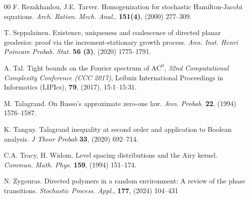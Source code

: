 \documentclass[reqno]{amsart}
\begin{document}
\begin{thebibliography}{00}
 F. Rezakhanlou, J.E. Tarver. Homogenization for stochastic Hamilton-Jacobi equations. {\em Arch. Ration. Mech. Anal.}, {\bf 151(4)}, (2000) 277--309.

 T. Seppalainen. Existence, uniqueness and coalescence of directed planar geodesics:
proof via the increment-stationary growth process. {\em Ann. Inst. Henri Poincare Probab.
Stat.} {\bf 56 (3)}, (2020) 1775--1791.

 A. Tal. Tight bounds on the Fourier spectrum of $\mbox{AC}^{0}$, {\em 32nd Computational Complexity Conference
(CCC 2017)}, Leibniz International Proceedings in Informatics (LIPIcs), {\bf 79}, (2017),  15:1--15:31.

 M. Talagrand. On Russo's approximate zero-one law. {\em Ann. Probab.} {\bf 22}, (1994) 1576--1587.

 K. Tanguy. Talagrand inequality at second order and application to Boolean analysis.  {\em J Theor Probab} {\bf 33}, (2020) 692--714.


 C.A. Tracy, H. Widom. Level spacing distributions and the Airy kernel. {\em Commun. Math. Phys.}
{\bf 159}, (1994) 151--174.

 N. Zygouras. Directed polymers in a random environment: A review of the phase
transitions. {\em Stochastic Process. Appl.}, {\bf 177}, (2024) 104--431
\end{thebibliography} 
\end{document}

